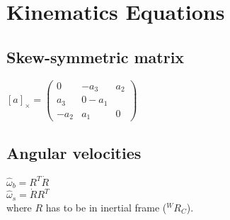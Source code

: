 \section{Kinematics Equations}
\subsection*{Skew-symmetric matrix}
$[a]_\times = \begin{pmatrix}
  0 & -a_3 & a_2 \\ 
  a_3 & 0 -a_1 \\
  -a_2 & a_1 & 0
\end{pmatrix}$

\subsection*{Angular velocities}
$\hat\omega_b = R^T \dot{R}$ \\
$\hat\omega_s = \dot{R}R^T$ \\
where $R$ has to be in inertial frame ($^W R_C$).

